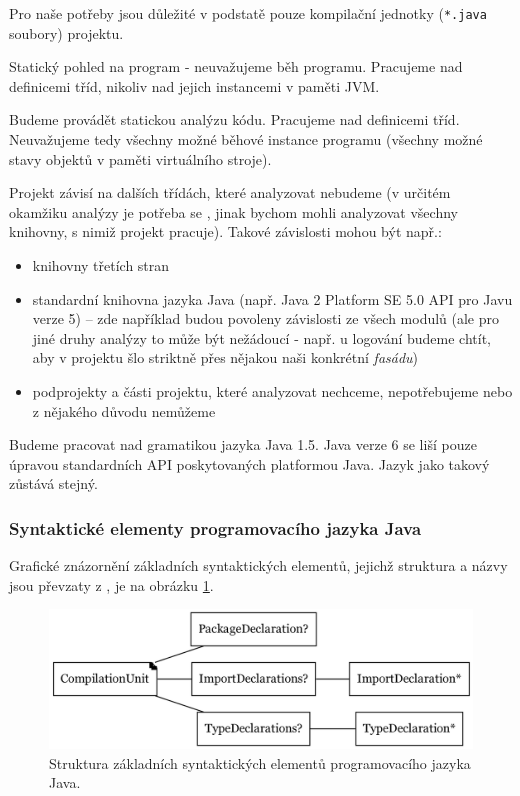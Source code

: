 Pro naše potřeby jsou důležité v podstatě pouze kompilační jednotky (\verb+*.java+ soubory) projektu.

Statický pohled na program - neuvažujeme běh programu. Pracujeme nad definicemi tříd, nikoliv nad jejich instancemi v paměti JVM.

Budeme provádět statickou analýzu kódu. Pracujeme nad definicemi tříd. Neuvažujeme tedy všechny možné běhové instance programu (všechny možné stavy objektů v paměti virtuálního stroje).

Projekt závisí na dalších třídách, které analyzovat nebudeme (v určitém okamžiku analýzy je potřeba se , jinak bychom mohli analyzovat všechny knihovny, s nimiž projekt pracuje). Takové závislosti mohou být např.:

\begin{itemize}
\item knihovny třetích stran
\item standardní knihovna jazyka Java (např. Java 2 Platform SE 5.0 API pro Javu verze 5) -- zde například budou povoleny závislosti ze všech modulů (ale pro jiné druhy analýzy to může být nežádoucí - např. u logování budeme chtít, aby v projektu šlo striktně přes nějakou naši konkrétní \emph{fasádu})
\item podprojekty a části projektu, které analyzovat nechceme, nepotřebujeme nebo z nějakého důvodu nemůžeme
\end{itemize}

Budeme pracovat nad gramatikou jazyka Java 1.5. Java verze 6 se liší pouze úpravou standardních API poskytovaných platformou Java. Jazyk jako takový zůstává stejný.

\subsubsection{Syntaktické elementy programovacího jazyka Java}
Grafické znázornění základních syntaktických elementů, jejichž struktura a názvy jsou převzaty z \cite{Gosling:2005:JLS:1036643}, je na obrázku \ref{toplevel_elements}.
\begin{figure}[h!]
  \centering
  \includegraphics[width=\textwidth]{./graphs/java_top_elements.png}
  \caption{Struktura základních syntaktických elementů programovacího jazyka Java.\label{toplevel_elements}}
\end{figure}

